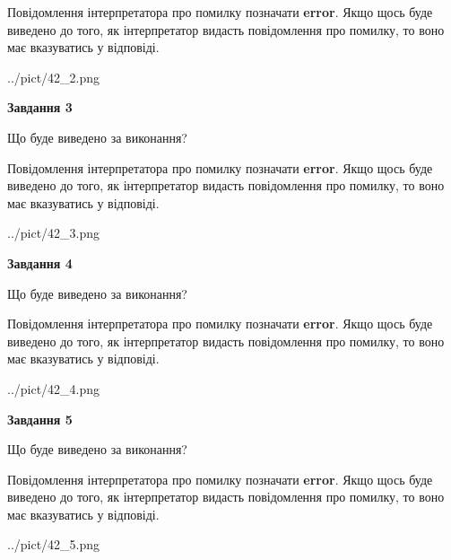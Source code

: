 \documentclass[12pt, ukrainian]{article}
\begin{document}
{\begin {large}
Повідомлення інтерпретатора про помилку позначати \textbf{error}.
Якщо щось буде виведено до того, як інтерпретатор видасть повідомлення про помилку, 
то воно має вказуватись у відповіді. \par


\begin{center}
	{../pict/42_2.png}
\end{center}
\newpage

{\begin {center}\textbf{Завдання 3}\end {center}}\par
Що буде виведено за виконання?

Повідомлення інтерпретатора про помилку позначати \textbf{error}.
Якщо щось буде виведено до того, як інтерпретатор видасть повідомлення про помилку, 
то воно має вказуватись у відповіді. \par


\begin{center}
	{../pict/42_3.png}
\end{center}
\newpage

{\begin {center}\textbf{Завдання 4}\end {center}}\par
Що буде виведено за виконання?

Повідомлення інтерпретатора про помилку позначати \textbf{error}.
Якщо щось буде виведено до того, як інтерпретатор видасть повідомлення про помилку, 
то воно має вказуватись у відповіді. \par


\begin{center}
	{../pict/42_4.png}
\end{center}
\newpage

{\begin {center}\textbf{Завдання 5}\end {center}}\par
Що буде виведено за виконання?

Повідомлення інтерпретатора про помилку позначати \textbf{error}.
Якщо щось буде виведено до того, як інтерпретатор видасть повідомлення про помилку, 
то воно має вказуватись у відповіді. \par


\begin{center}
	{../pict/42_5.png}
\end{center}
\newpage


\end{large}}
\end{document}

